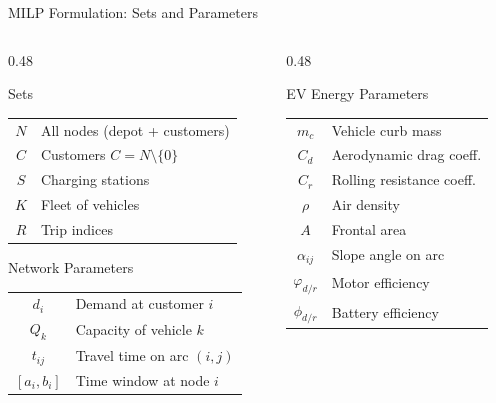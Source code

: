 \documentclass[aspectratio=169,11pt]{beamer}
\begin{document}
\begin{frame}{MILP Formulation: Sets and Parameters}
    \begin{columns}[T]
        \begin{column}{0.48\textwidth}
            \begin{block}{Sets}
                \begin{tabular}{cl}
                    $N$ & All nodes (depot + customers) \\
                    $C$ & Customers $C = N \setminus \{0\}$ \\
                    $S$ & Charging stations \\
                    $K$ & Fleet of vehicles \\
                    $R$ & Trip indices
                \end{tabular}
            \end{block}
            
            \vspace{0.3cm}
            \begin{block}{Network Parameters}
                \begin{tabular}{cl}
                    $d_i$ & Demand at customer $i$ \\
                    $Q_k$ & Capacity of vehicle $k$ \\
                    $t_{ij}$ & Travel time on arc $(i,j)$ \\
                    $[a_i, b_i]$ & Time window at node $i$
                \end{tabular}
            \end{block}
        \end{column}
        \begin{column}{0.48\textwidth}
            \begin{block}{EV Energy Parameters}
                \begin{tabular}{cl}
                    $m_c$ & Vehicle curb mass \\
                    $C_d$ & Aerodynamic drag coeff. \\
                    $C_r$ & Rolling resistance coeff. \\
                    $\rho$ & Air density \\
                    $A$ & Frontal area \\
                    $\alpha_{ij}$ & Slope angle on arc \\
                    $\varphi_{d/r}$ & Motor efficiency \\
                    $\phi_{d/r}$ & Battery efficiency
                \end{tabular}
            \end{block}
        \end{column}
    \end{columns}
\end{frame}
\end{document}
